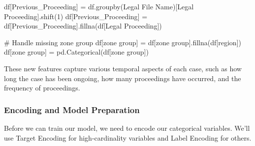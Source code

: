 \documentclass[
  letterpaper,
  DIV=11,
  numbers=noendperiod]{scrartcl}
\newenvironment{Shaded}{\begin{snugshade}}{\end{snugshade}}
\newcommand{\CommentTok}[1]{\textcolor[rgb]{0.37,0.37,0.37}{#1}}
\newcommand{\DecValTok}[1]{\textcolor[rgb]{0.68,0.00,0.00}{#1}}
\newcommand{\NormalTok}[1]{\textcolor[rgb]{0.00,0.23,0.31}{#1}}
\newcommand{\OperatorTok}[1]{\textcolor[rgb]{0.37,0.37,0.37}{#1}}
\newcommand{\StringTok}[1]{\textcolor[rgb]{0.13,0.47,0.30}{#1}}
\begin{document}
\begin{Shaded}
\begin{Highlighting}[]
\NormalTok{df[}\StringTok{\textquotesingle{}Previous\_Proceeding\textquotesingle{}}\NormalTok{] }\OperatorTok{=}\NormalTok{ df.groupby(}\StringTok{\textquotesingle{}Legal File Name\textquotesingle{}}\NormalTok{)[}\StringTok{\textquotesingle{}Legal Proceeding\textquotesingle{}}\NormalTok{].shift(}\DecValTok{1}\NormalTok{)}
\NormalTok{df[}\StringTok{\textquotesingle{}Previous\_Proceeding\textquotesingle{}}\NormalTok{] }\OperatorTok{=}\NormalTok{ df[}\StringTok{\textquotesingle{}Previous\_Proceeding\textquotesingle{}}\NormalTok{].fillna(df[}\StringTok{\textquotesingle{}Legal Proceeding\textquotesingle{}}\NormalTok{])}

\CommentTok{\# Handle missing zone group}
\NormalTok{df[}\StringTok{\textquotesingle{}zone group\textquotesingle{}}\NormalTok{] }\OperatorTok{=}\NormalTok{ df[}\StringTok{\textquotesingle{}zone group\textquotesingle{}}\NormalTok{].fillna(df[}\StringTok{\textquotesingle{}region\textquotesingle{}}\NormalTok{])}
\NormalTok{df[}\StringTok{\textquotesingle{}zone group\textquotesingle{}}\NormalTok{] }\OperatorTok{=}\NormalTok{ pd.Categorical(df[}\StringTok{\textquotesingle{}zone group\textquotesingle{}}\NormalTok{])}
\end{Highlighting}
\end{Shaded}

These new features capture various temporal aspects of each case, such
as how long the case has been ongoing, how many proceedings have
occurred, and the frequency of proceedings.

\subsubsection{Encoding and Model Preparation}\label{sec-encoding}

Before we can train our model, we need to encode our categorical
variables. We'll use Target Encoding for high-cardinality variables and
Label Encoding for others.
\end{document}
